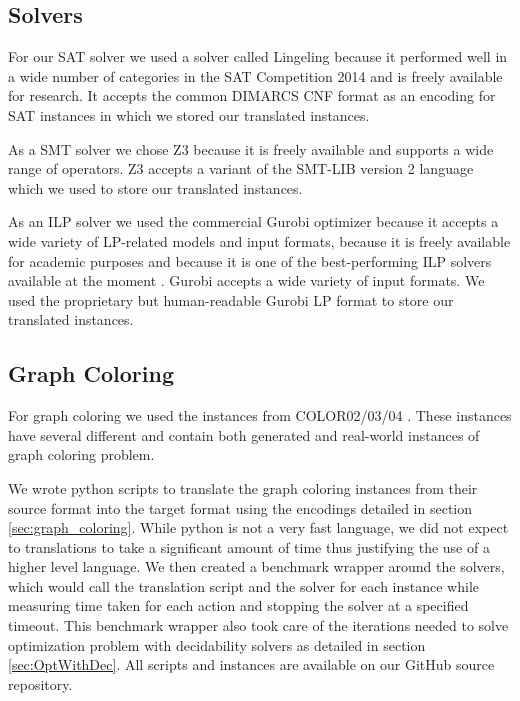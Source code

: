 \documentclass{sig-alternate}
\begin{document}
\subsection{Solvers}

For our SAT solver we used a solver called Lingeling \cite{solverLingeling} because it performed well in a wide number of categories in the SAT Competition 2014 \cite{comp2014sat} and is freely available for research.
It accepts the common DIMARCS CNF format \cite{challenge1993satisfiability} as an encoding for SAT instances in which we stored our translated instances.

As a SMT solver we chose Z3 \cite{de2008z3} because it is freely available and supports a wide range of operators.
Z3 accepts a variant of the SMT-LIB version 2 \cite{barrett2010smt} language which we used to store our translated instances.

As an ILP solver we used the commercial Gurobi optimizer \cite{gurobi} because it accepts a wide variety of LP-related models and input formats, because it is freely available for academic purposes and because it is one of the best-performing ILP solvers available at the moment \cite{meindl2012analysis}.
Gurobi accepts a wide variety of input formats.
We used the proprietary but human-readable Gurobi LP format to store our translated instances.

\subsection{Graph Coloring}

For graph coloring we used the instances from COLOR02/03/04 \cite{color04}.
These instances have several different and contain both generated and real-world instances of graph coloring problem.

We wrote python scripts to translate the graph coloring instances from their source format into the target format using the encodings detailed in section \ref{sec:graph_coloring}.
While python is not a very fast language, we did not expect to translations to take a significant amount of time thus justifying the use of a higher level language.
We then created a benchmark wrapper around the solvers, which would call the translation script and the solver for each instance while measuring time taken for each action and stopping the solver at a specified timeout.
This benchmark wrapper also took care of the iterations needed to solve optimization problem with decidability solvers as detailed in section \ref{sec:OptWithDec}. All scripts and instances are available on our GitHub source repository.
\end{document}
